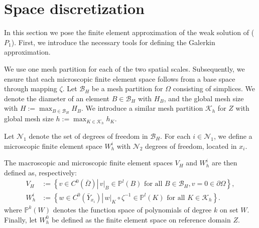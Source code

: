 \documentclass{article}
\newcommand{\macromesh}{\mathcal{ B}_H}
\newcommand{\B}{\mathcal{ B}}
\renewcommand{\P}{\mathbb{ P}}
\newcommand{\K}{\mathcal{ K}}
\begin{document}
\section{Space discretization}
\label{sec:wellposedness}
In this section we pose the finite element approximation of the weak solution of ($P_1$).
First, we introduce the necessary tools for defining the Galerkin approximation.

We use one mesh partition for each of the two spatial scales. Subsequently, we ensure that each microscopic finite element space follows from a base space through mapping $\zeta$.
Let $\B_H$ be a mesh partition for $\Omega$ consisting of simplices. We denote the diameter of an element $B \in \B_H$ with $H_B$, and the global mesh size with $H:= \max_{B \in \B_H} H_B$.
We introduce a similar mesh partition $\K_h$ for $Z$ with global mesh size $h:= \max_{K \in \K_h} h_K$.

Let $\mathcal{N}_1$ denote the set of degrees of freedom in $\macromesh$. For each $i \in \mathcal{N}_1$, we define a microscopic finite element space $W_h^i$ with $\mathcal{N}_2$ degrees of freedom, located in $x_i$.

The macroscopic and microscopic finite element spaces $V_H$ and $W_h^i$ are then defined as, respectively:
\begin{align*}
    V_H &:= \left\{ \left. v \in C^0(\bar{\Omega})\right|\,v|_B \in \P^l(B) \mbox{ for all } B \in \B_H, v=0 \in \partial \Omega  \right\},\\
        W_h^i &:= \left\{ \left. w \in C^0(\bar{Y}_{x_i})\right|\,w|_K \circ \zeta^{-1} \in \P^l(K) \mbox{ for all } K \in \K_h  \right\}.
\end{align*}
where $\P^k(W)$ denotes the function space of polynomials of degree $k$ on set $W$.
Finally, let $W^0_h$ be defined as the finite element space on reference domain $Z$.
\end{document}

